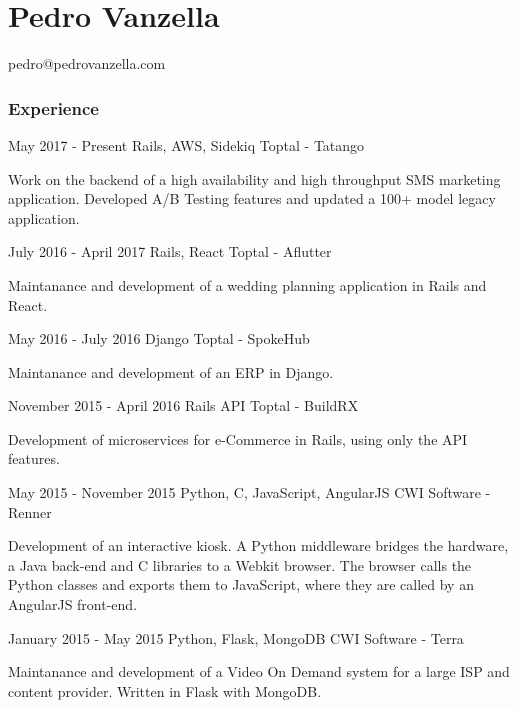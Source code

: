 \documentclass{tccv}
\begin{document}
\part{Pedro Vanzella}

    {}
    {pedro@pedrovanzella.com}

    \section{Experience}

    \begin{eventlist}

    \item{May 2017 - Present}
      {Rails, AWS, Sidekiq}
      {Toptal - Tatango}

      Work on the backend of a high availability and high throughput SMS
      marketing application. Developed A/B Testing features and updated a
      100+ model legacy application.

    \item{July 2016 - April 2017}
      {Rails, React}
      {Toptal - Aflutter}

      Maintanance and development of a wedding planning application in Rails and
      React.

    \item{May 2016 - July 2016}
      {Django}
      {Toptal - SpokeHub}

      Maintanance and development of an ERP in Django.

    \item{November 2015 - April 2016}
      {Rails API}
      {Toptal - BuildRX}

      Development of microservices for e-Commerce in Rails, using only the API features.

    \item{May 2015 - November 2015}
      {Python, C, JavaScript, AngularJS}
      {CWI Software - Renner}
      
      Development of an interactive kiosk. A Python middleware bridges the hardware, a
      Java back-end and C libraries to a Webkit browser. The browser calls the Python
      classes and exports them to JavaScript, where they are called by an AngularJS front-end.

    \item{January 2015 - May 2015}
      {Python, Flask, MongoDB}
      {CWI Software - Terra}

      Maintanance and development of a Video On Demand system for a large ISP and
      content provider. Written in Flask with MongoDB.


\end{eventlist}
\end{document}
